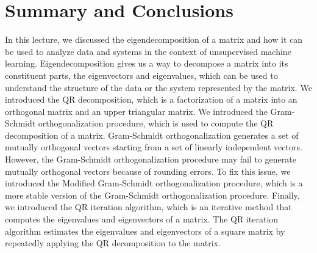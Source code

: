\documentclass{article}[11pt]
\begin{document}
\section{Summary and Conclusions}
In this lecture, we discussed the eigendecomposition of a matrix and how it can be used to analyze data and systems in the context of unsupervised machine learning.
Eigendecomposition gives us a way to decompose a matrix into its constituent parts, the eigenvectors and eigenvalues, which can be used to understand the structure of the data or the system represented by the matrix.
We introduced the QR decomposition, which is a factorization of a matrix into an orthogonal matrix and an upper triangular matrix.
We introduced the Gram-Schmidt orthogonalization procedure, which is used to compute the QR decomposition of a matrix.
Gram-Schmidt orthogonalization generates a set of mutually orthogonal vectors starting from a set of linearly independent vectors.
However, the Gram-Schmidt orthogonalization procedure may fail to generate mutually orthogonal vectors because of rounding errors.
To fix this issue, we introduced the Modified Gram-Schmidt orthogonalization procedure, which is a more stable version of the Gram-Schmidt orthogonalization procedure.
Finally, we introduced the QR iteration algorithm, which is an iterative method that computes the eigenvalues and eigenvectors of a matrix.
The QR iteration algorithm estimates the eigenvalues and eigenvectors of a square matrix by repeatedly applying the QR decomposition to the matrix.


\end{document}
